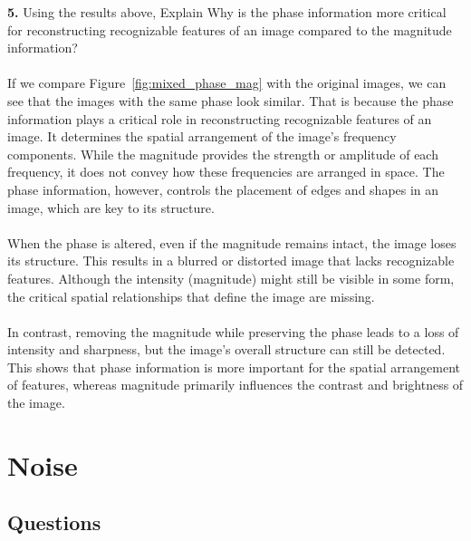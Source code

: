 \documentclass[hidelinks,12pt]{article}
\begin{document}
	 \textbf{5.} Using the results above, Explain Why is the phase information more critical for reconstructing recognizable features of an image compared to the magnitude information?
	
	
	\paragraph{}
	If we compare Figure~\ref{fig:mixed_phase_mag} with the original images, we can see that the images with the same phase look similar. That is because the phase information plays a critical role in reconstructing recognizable features of an image. It determines the spatial arrangement of the image's frequency components. While the magnitude provides the strength or amplitude of each frequency, it does not convey how these frequencies are arranged in space. The phase information, however, controls the placement of edges and shapes in an image, which are key to its structure.
	
	\paragraph{}
	When the phase is altered, even if the magnitude remains intact, the image loses its structure. This results in a blurred or distorted image that lacks recognizable features. Although the intensity (magnitude) might still be visible in some form, the critical spatial relationships that define the image are missing.
	
	\paragraph{}
	In contrast, removing the magnitude while preserving the phase leads to a loss of intensity and sharpness, but the image's overall structure can still be detected. This shows that phase information is more important for the spatial arrangement of features, whereas magnitude primarily influences the contrast and brightness of the image.
	
	
	\pagebreak
	
	\section{Noise}
	\subsection{Questions}
	
\end{document}

